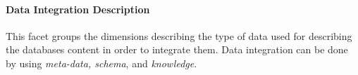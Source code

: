 
\paragraph{Data Integration Description}
 This facet groups the dimensions describing the type of data used for describing the databases content in order to  integrate them. Data integration can be done by using {\em meta-data, schema}, and {\em knowledge}.


